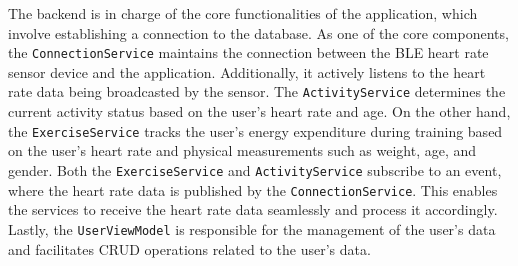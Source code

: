 The backend is in charge of the core functionalities of the application, which involve establishing a connection to the database.
As one of the core components, the \texttt{ConnectionService} maintains the connection between the BLE heart rate sensor device and the application. Additionally, it actively listens to the heart rate data being broadcasted by the sensor. 
The \texttt{ActivityService} determines the current activity status based on the user's heart rate and age. 
On the other hand, the \texttt{ExerciseService} tracks the user's energy expenditure during training based on the user's heart rate and physical measurements such as weight, age, and gender. Both the \texttt{ExerciseService} and \texttt{ActivityService} subscribe to an event, where the heart rate data is published by the \texttt{ConnectionService}. This enables the services to receive the heart rate data seamlessly and process it accordingly.
Lastly, the \texttt{UserViewModel} is responsible for the management of the user's data and facilitates CRUD operations related to the user's data.
